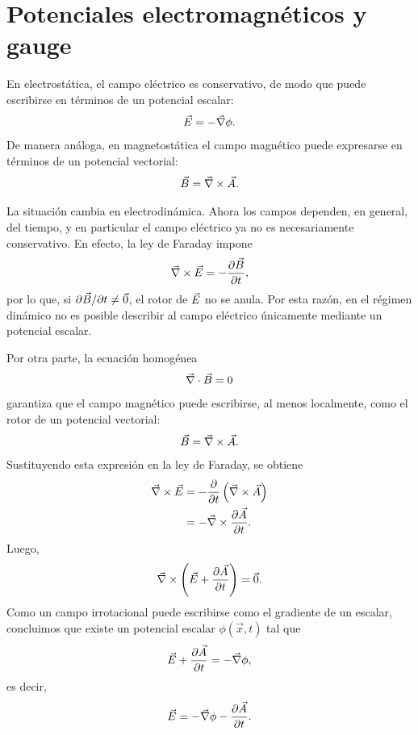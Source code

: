 \documentclass[../main.tex]{subfiles}
\begin{document}
\chapter{Potenciales electromagnéticos y gauge}

En electrostática, el campo eléctrico es conservativo, de modo que puede escribirse en términos de un potencial escalar:
\begin{equation}\label{3.potencial-electrostatico}
    \vec{E} = -\vec\nabla\phi.
\end{equation}
De manera análoga, en magnetostática el campo magnético puede expresarse en términos de un potencial vectorial:
\begin{equation*}
    \vec{B} = \vec\nabla\times\vec A.
\end{equation*}

La situación cambia en electrodinámica. Ahora los campos dependen, en general, del tiempo, y en particular el campo eléctrico ya no es necesariamente conservativo. En efecto, la ley de Faraday impone
\begin{equation*}
    \vec\nabla\times\vec{E} = -\frac{\partial \vec{B}}{\partial t},
\end{equation*}
por lo que, si $\partial \vec{B}/\partial t \neq \vec 0$, el rotor de $\vec{E}$ no se anula. Por esta razón, en el régimen dinámico no es posible describir al campo eléctrico únicamente mediante un potencial escalar.

Por otra parte, la ecuación homogénea
\begin{equation*}
    \vec\nabla\cdot \vec{B} = 0
\end{equation*}
garantiza que el campo magnético puede escribirse, al menos localmente, como el rotor de un potencial vectorial:
\begin{equation*}
    \vec{B} = \vec\nabla\times\vec A.
\end{equation*}
Sustituyendo esta expresión en la ley de Faraday, se obtiene
\begin{align*}
    \vec\nabla\times\vec{E} &= -\frac{\partial}{\partial t}\left(\vec\nabla\times\vec A\right) \\
    &= -\vec\nabla\times\frac{\partial \vec A}{\partial t}.
\end{align*}
Luego,
\begin{equation*}
    \vec\nabla\times\left(\vec{E} + \frac{\partial \vec A}{\partial t}\right) = \vec 0.
\end{equation*}
Como un campo irrotacional puede escribirse como el gradiente de un escalar, concluimos que existe un potencial escalar $\phi(\vec x,t)$ tal que
\begin{equation*}
    \vec{E} + \frac{\partial \vec A}{\partial t} = -\vec\nabla \phi,
\end{equation*}
es decir,
\begin{equation*}
    \vec{E} = -\vec\nabla \phi - \frac{\partial \vec A}{\partial t}.
\end{equation*}
\end{document}
